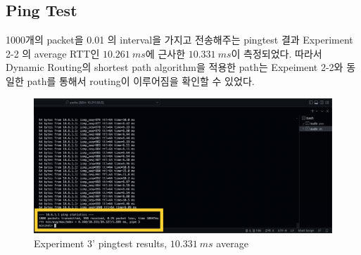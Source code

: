     \subsection*{Ping Test}
    1000개의 packet을 0.01 의 interval을 가지고 전송해주는 pingtest 결과 Experiment 2-2 의 average RTT인 \textbf{$10.261\ ms$}에 근사한 \textbf{$10.331\ ms$}이 측정되었다. 따라서 Dynamic Routing의 shortest path algorithm을 적용한 path는 Expeiment 2-2와 동일한 path를 통해서 routing이 이루어짐을 확인할 수 있었다.\\
    \vspace{-4mm}
    \begin{figure}[!h]\centering 
    	\includegraphics[width=.99\textwidth]{image/week08/3-2.png}
    	\caption{\footnotesize
    	  Experiment 3' pingtest results, $10.331\ ms$ average}
    	\vspace{-10pt}
    \end{figure}
    \clearpage
